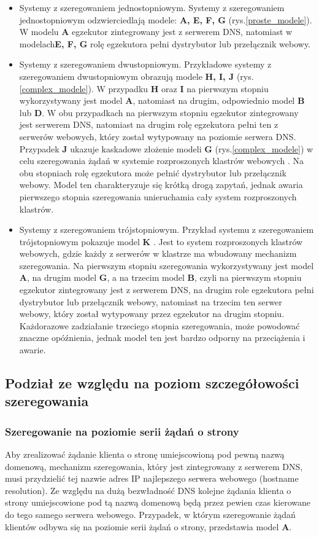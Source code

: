 \begin{itemize}
\item Systemy z szeregowaniem jednostopniowym. Systemy z szeregowaniem jednostopniowym odzwierciedlają modele: {\bf A, E, F, G} (rys.\ref{proste_modele}). 
W modelu {\bf A} egzekutor zintegrowany jest z serwerem DNS, natomiast w modelach{\bf E, F, G} rolę egzekutora pełni dystrybutor 
lub przełącznik webowy.
\item Systemy z szeregowaniem dwustopniowym. Przykładowe systemy z szeregowaniem dwustopniowym obrazują modele {\bf H, I, J} (rys.\ref{complex_modele}).
W przypadku {\bf H} oraz {\bf I} \cite{modele2,modele10,modele23,modele3} na pierwszym stopniu wykorzystywany jest model {\bf A}, natomiast na drugim, odpowiednio 
model {\bf B} lub {\bf D}. W obu przypadkach na pierwszym stopniu egzekutor zintegrowany jest serwerem DNS, natomiast na drugim rolę 
egzekutora pełni ten z serwerów webowych, który został wytypowany na poziomie serwera DNS. Przypadek {\bf J} ukazuje kaskadowe 
złożenie modeli {\bf G} (rys.\ref{complex_modele}) w celu szeregowania żądań w systemie rozproszonych klastrów webowych \cite{NDUsersGuide}. Na obu stopniach rolę egzekutora 
może pełnić dystrybutor lub przełącznik webowy. Model ten charakteryzuje się krótką drogą zapytań, jednak awaria pierwszego 
stopnia szeregowania unieruchamia cały system rozproszonych klastrów.
\item Systemy z szeregowaniem trójstopniowym. Przykład systemu z szeregowaniem trójstopniowym pokazuje model {\bf K} \cite{modele9}. Jest to 
system rozproszonych klastrów webowych, gdzie każdy z serwerów w klastrze ma wbudowany mechanizm szeregowania. Na pierwszym 
stopniu szeregowania wykorzystywany jest model {\bf A}, na drugim model {\bf G}, a na trzecim model {\bf B}, czyli na pierwszym stopniu 
egzekutor zintegrowany jest z serwerem DNS, na drugim role egzekutora pełni dystrybutor lub przełącznik webowy, natomiast na 
trzecim ten serwer webowy, który został wytypowany przez egzekutor na drugim stopniu. Każdorazowe zadziałanie trzeciego 
stopnia szeregowania, może powodować znaczne opóźnienia, jednak model ten jest bardzo odporny na przeciążenia i awarie. 
\end{itemize}

\subsection{Podział ze względu na poziom szczegółowości szeregowania}

\subsubsection{Szeregowanie na poziomie serii żądań o strony}
Aby zrealizować żądanie klienta o stronę umiejscowioną pod pewną nazwą domenową, mechanizm szeregowania, który jest 
zintegrowany z serwerem DNS, musi przydzielić tej nazwie adres IP najlepszego serwera webowego (hostname resolution). Ze 
względu na dużą bezwładność DNS kolejne żądania klienta o strony umiejscowione pod tą nazwą domenową będą przez pewien czas 
kierowane do tego samego serwera webowego. Przypadek, w którym szeregowanie żądań klientów odbywa się na poziomie serii żądań 
o strony, przedstawia model {\bf A}. 

